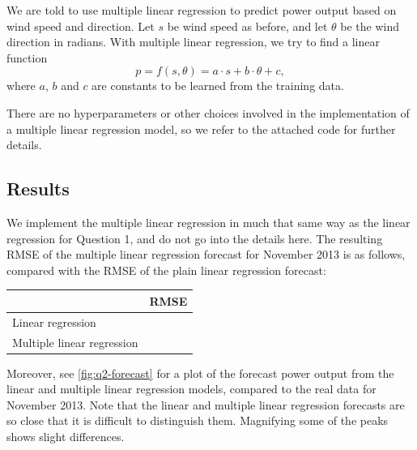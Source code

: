\documentclass[11pt]{article}
\begin{document}
We are told to use multiple linear regression to predict power output based on wind speed and direction.
Let $s$ be wind speed as before, and let $\theta$ be the wind direction in radians.
With multiple linear regression, we try to find a linear function
\begin{equation*}
  p = f(s, \theta) = a \cdot s + b \cdot \theta + c,
\end{equation*}
where $a$, $b$ and $c$ are constants to be learned from the training data.

There are no hyperparameters or other choices involved in the implementation of a multiple linear regression model, so we refer to the attached code for further details.

\subsection*{Results}
We implement the multiple linear regression in much that same way as the linear regression for Question 1, and do not go into the details here.
The resulting RMSE of the multiple linear regression forecast for November 2013 is as follows, compared with the RMSE of the plain linear regression forecast:
\begin{center}
  \begin{tabular}{ll}
    \toprule
    & RMSE \\ \midrule
    Linear regression &  \\
    Multiple linear regression &  \\ \bottomrule
  \end{tabular}
\end{center}

Moreover, see \cref{fig:q2-forecast} for a plot of the forecast power output from the linear and multiple linear regression models, compared to the real data for November 2013.
Note that the linear and multiple linear regression forecasts are so close that it is difficult to distinguish them.
Magnifying some of the peaks shows slight differences.
\end{document}
